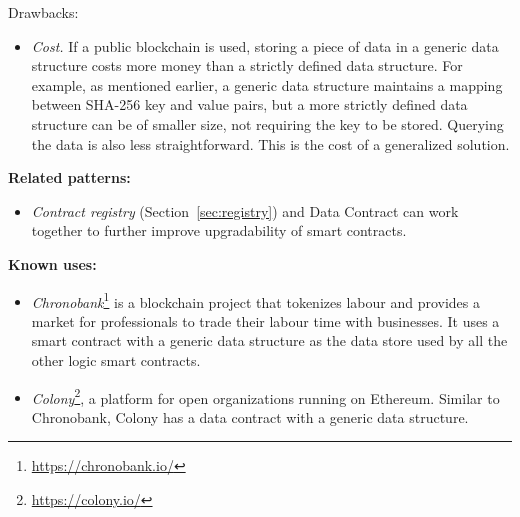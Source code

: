 Drawbacks: 
\begin{itemize}
   \item \textit{Cost.} If a public blockchain is used, storing a piece of data in a generic data structure costs more money than a strictly defined data structure. For example, as mentioned earlier, a generic data structure maintains a mapping between SHA-256 key and value pairs, but a more strictly defined data structure can be of smaller size, \eg not requiring the key to be stored. Querying the data is also less straightforward. This is the cost of a generalized solution.  
\end{itemize}


\vspace{0.5em}\noindent \textbf{Related patterns:}
\begin{itemize}
    \item \textit{Contract registry} (Section~\ref{sec:registry}) and Data Contract can work together to further improve upgradability of smart contracts.
\end{itemize}

  

\vspace{0.5em}\noindent \textbf{Known uses:}
\begin{itemize}
  \item \textit{Chronobank}\footnote{\url{https://chronobank.io/}} is a blockchain project that tokenizes labour and provides a market for professionals to trade their labour time with businesses. It uses a smart contract with a generic data structure as the data store used by all the other logic smart contracts.
  \item \textit{Colony}\footnote{\url{https://colony.io/}}, a platform for open organizations running on Ethereum. Similar to Chronobank, Colony has a data contract with a generic data structure. 
\end{itemize}



